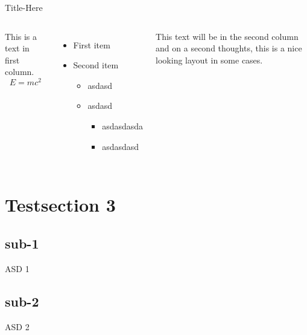 \documentclass[aspectratio=169]{beamer}
\begin{document}
\begin{frame}{Title-Here}
    \begin{columns}
            This is a text in first column.
            $$E=mc^2$$
            \begin{itemize}
                \item First item
                \item Second item
                \begin{itemize}
                    \item asdasd
                    \item asdasd
                    \begin{itemize}
                        \item asdasdasda
                        \item asdasdasd
                    \end{itemize}
                \end{itemize}
            \end{itemize}
        
            This text will be in the second column
            and on a second thoughts, this is a nice looking
            layout in some cases.
    \end{columns}
\end{frame}

\section{Testsection 3}
\subsection{sub-1}
\begin{frame}{ASD 1}
\end{frame}

\subsection{sub-2}
\begin{frame}{ASD 2}
\end{frame}
\end{document}
